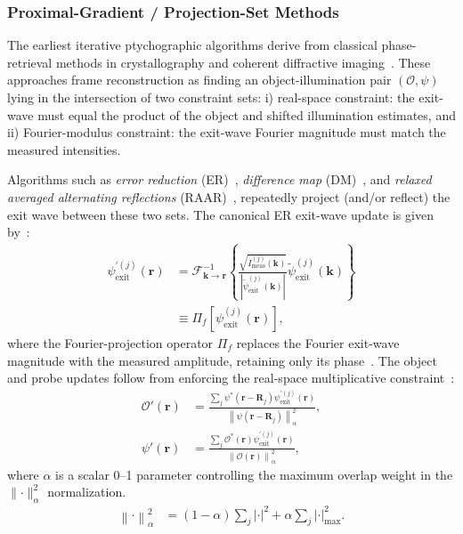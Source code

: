 \documentclass[pdflatex,sn-aps,iicol]{sn-jnl}%
\begin{document}
\subsubsection{Proximal-Gradient / Projection-Set Methods}
\label{sec:projection-methods}

The earliest iterative ptychographic algorithms derive from classical phase-retrieval methods in crystallography and coherent diffractive imaging~\cite{karle1985,Fienup_1982,Levi_1984,Miao_1999,Bauschke_2002,Elser_2003,Thibault_2008}.
These approaches frame reconstruction as finding an object-illumination pair $(\mathcal{O},\psi)$ lying in the intersection of two constraint sets: i) real-space constraint: the exit-wave must equal the product of the object and shifted illumination estimates, and ii) Fourier-modulus constraint: the exit-wave Fourier magnitude must match the measured intensities.

Algorithms such as \emph{error reduction} (ER)~\cite{Levi_1984}, \emph{difference map} (DM)~\cite{Elser_2003,Thibault_2008}, and \emph{relaxed averaged alternating reflections} (RAAR)~\cite{Luke_2004}, repeatedly project (and/or reflect) the exit wave between these two sets.
The canonical ER exit-wave update is given by~\cite{Bauschke_2002}:
\begin{align}
\psi_{\text{exit}}^{'(j)}(\boldsymbol{r})
&=
\mathcal{F}_{\boldsymbol{k}\to\boldsymbol{r}}^{-1}
\left\{
\frac{\sqrt{I_{\text{meas}}^{(j)}(\boldsymbol{k})}}
{\left\lvert \tilde{\psi}_{\text{exit}}^{(j)}(\boldsymbol{k}) \right\rvert}
\tilde{\psi}_{\text{exit}}^{(j)}(\boldsymbol{k})
\right\}
\nonumber\\
&\equiv
\Pi_f\!\left[\psi_{\text{exit}}^{(j)}(\boldsymbol{r})\right],
\label{eq:proj-exit-wave}
\end{align}
where the Fourier-projection operator $\Pi_f$ replaces the Fourier exit-wave magnitude with the measured amplitude, retaining only its phase~\cite{Fienup_1982,Bauschke_2002}.
The object and probe updates follow from enforcing the real-space multiplicative constraint~\cite{Thibault_2008}:
\begin{align}
\mathcal{O}'(\boldsymbol{r})
&=
\frac{
\sum_j
\psi^{*}(\boldsymbol{r}-\boldsymbol{R}_j)
\psi_{\text{exit}}^{'(j)}(\boldsymbol{r})
}{
\left \lVert \psi(\boldsymbol{r}-\boldsymbol{R}_j)\right \rVert^2_{\alpha}},\\
\psi'(\boldsymbol{r})
&=
\frac{
\sum_j
\mathcal{O}^{*}(\boldsymbol{r})
\psi_{\text{exit}}^{'(j)}(\boldsymbol{r})
}{
\left \lVert\mathcal{O}(\boldsymbol{r})\right \rVert^2_{\alpha}
},
\label{eq:proj-update}
\end{align}
where $\alpha$ is a scalar 0--1 parameter controlling the maximum overlap weight in the $\lVert\cdot\rVert^2_{\alpha}$ normalization.
\begin{align}
\left \lVert\cdot \right \rVert ^2_{\alpha}
&=
(1-\alpha)\sum_j \lvert \cdot \rvert^2
+
\alpha \sum_j \lvert \cdot \rvert^2_{\text{max}}.
\label{eq:normalization}
\end{align}
\end{document}
